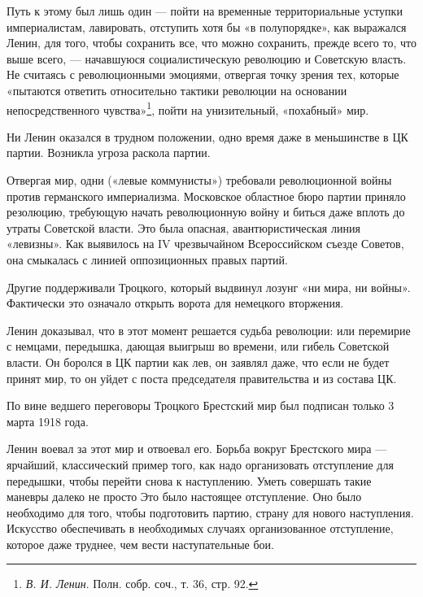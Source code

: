 \documentclass[12pt, a4paper, openany]{book}
\begin{document}
Путь к этому был лишь один — пойти на временные территориальные уступки империалистам, лавировать, отступить хотя бы «в полупорядке», как выражался Ленин, для того, чтобы сохранить все, что можно сохранить, прежде всего то, что выше всего, — начавшуюся социалистическую революцию и Советскую власть. Не считаясь с революционными эмоциями, отвергая точку зрения тех, которые «пытаются ответить относительно тактики революции на основании непосредственного чувства»\footnote{\textit{В. И. Ленин}. Полн. собр. соч., т. 36, стр. 92.}, пойти на унизительный, «похабный» мир.

Ни Ленин оказался в трудном положении, одно время даже в меньшинстве в ЦК партии. Возникла угроза раскола партии.

Отвергая мир, одни («левые коммунисты») требовали революционной войны против германского империализма. Московское областное бюро партии приняло резолюцию, требующую начать революционную войну и биться даже вплоть до утраты Советской власти. Это была опасная, авантюристическая линия «левизны». Как выявилось на IV чрезвычайном Всероссийском съезде Советов, она смыкалась с линией оппозиционных правых партий.

Другие поддерживали Троцкого, который выдвинул лозунг «ни мира, ни войны». Фактически это означало открыть ворота для немецкого вторжения.

Ленин доказывал, что в этот момент решается судьба революции: или перемирие с немцами, передышка, дающая выигрыш во времени, или гибель Советской власти. Он боролся в ЦК партии как лев, он заявлял даже, что если не будет принят мир, то он уйдет с поста председателя правительства и из состава ЦК.

По вине ведшего переговоры Троцкого Брестский мир был подписан только 3 марта 1918 года.

Ленин воевал за этот мир и отвоевал его. Борьба вокруг Брестского мира — ярчайший, классический пример того, как надо организовать отступление для передышки, чтобы перейти снова к наступлению. Уметь совершать такие маневры далеко не просто Это было настоящее отступление. Оно было необходимо для того, чтобы подготовить партию, страну для нового наступления. Искусство обеспечивать в необходимых случаях организованное отступление, которое даже труднее, чем вести наступательные бои.
\end{document}
